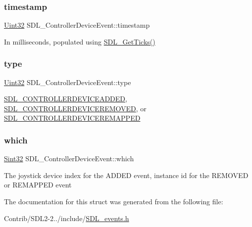 \subsubsection{\texorpdfstring{timestamp}{timestamp}}
{\footnotesize\ttfamily \mbox{\hyperlink{_s_d_l__stdinc_8h_add440eff171ea5f55cb00c4a9ab8672d}{Uint32}} S\+D\+L\+\_\+\+Controller\+Device\+Event\+::timestamp}

In milliseconds, populated using \mbox{\hyperlink{_s_d_l__timer_8h_a0b9bc71d6287e0ffafdc3419760fe2b3}{S\+D\+L\+\_\+\+Get\+Ticks()}} \mbox{\label{struct_s_d_l___controller_device_event_a45b3807eaf70a5f5cf712455da277536}} 
\subsubsection{\texorpdfstring{type}{type}}
{\footnotesize\ttfamily \mbox{\hyperlink{_s_d_l__stdinc_8h_add440eff171ea5f55cb00c4a9ab8672d}{Uint32}} S\+D\+L\+\_\+\+Controller\+Device\+Event\+::type}

\mbox{\hyperlink{_s_d_l__events_8h_a3b589e89be6b35c02e0dd34a55f3fccaa9642de478348da1aba4fb5791e8c5314}{S\+D\+L\+\_\+\+C\+O\+N\+T\+R\+O\+L\+L\+E\+R\+D\+E\+V\+I\+C\+E\+A\+D\+D\+ED}}, \mbox{\hyperlink{_s_d_l__events_8h_a3b589e89be6b35c02e0dd34a55f3fccaae00ac6995dfb7b92bfae68b9f47ae07a}{S\+D\+L\+\_\+\+C\+O\+N\+T\+R\+O\+L\+L\+E\+R\+D\+E\+V\+I\+C\+E\+R\+E\+M\+O\+V\+ED}}, or \mbox{\hyperlink{_s_d_l__events_8h_a3b589e89be6b35c02e0dd34a55f3fccaaeca87c7b5bb21915d444298449a78ee6}{S\+D\+L\+\_\+\+C\+O\+N\+T\+R\+O\+L\+L\+E\+R\+D\+E\+V\+I\+C\+E\+R\+E\+M\+A\+P\+P\+ED}} \mbox{\label{struct_s_d_l___controller_device_event_accb80de1619c1e790cffb6c888c915db}} 
\subsubsection{\texorpdfstring{which}{which}}
{\footnotesize\ttfamily \mbox{\hyperlink{_s_d_l__stdinc_8h_a7a90b941db9d4582e9ad7abb9940ff7e}{Sint32}} S\+D\+L\+\_\+\+Controller\+Device\+Event\+::which}

The joystick device index for the A\+D\+D\+ED event, instance id for the R\+E\+M\+O\+V\+ED or R\+E\+M\+A\+P\+P\+ED event 

The documentation for this struct was generated from the following file\+:\begin{DoxyCompactItemize}
\item 
Contrib/\+S\+D\+L2-\/2../include/\mbox{\hyperlink{_s_d_l__events_8h}{S\+D\+L\+\_\+events.\+h}}\end{DoxyCompactItemize}
